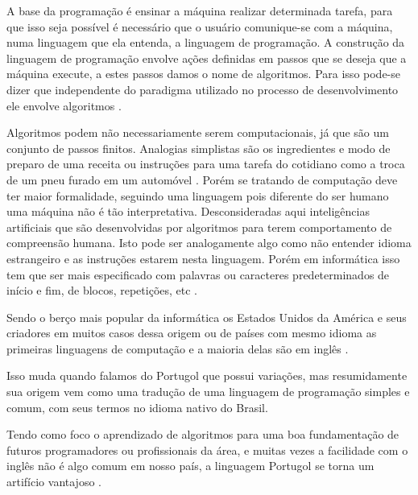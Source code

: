 \ifdraft{\color{green}}{}A base da programação é ensinar a máquina realizar determinada tarefa, para que isso seja possível é necessário que o usuário comunique-se com a máquina, numa linguagem que ela entenda, a linguagem de programação. A construção da linguagem de programação envolve ações definidas em passos que se deseja que a máquina execute, a estes passos damos o nome de algoritmos. Para isso pode-se dizer que independente do paradigma utilizado no processo de desenvolvimento ele envolve algoritmos \cite{medeiros2015}.

Algoritmos podem não necessariamente serem computacionais, já que são um conjunto de passos finitos. Analogias simplistas são os ingredientes e modo de preparo de uma receita ou instruções para uma tarefa do cotidiano como a troca de um pneu furado em um automóvel \cite{medina2006etal}. Porém se tratando de computação deve ter maior formalidade, seguindo uma linguagem pois diferente do ser humano uma máquina não é tão interpretativa. Desconsideradas aqui inteligências artificiais que são desenvolvidas por algoritmos para terem  comportamento de compreensão humana. Isto pode ser analogamente algo como não entender idioma estrangeiro e as instruções estarem nesta linguagem. Porém em informática isso tem que ser mais especificado com palavras ou caracteres predeterminados de início e fim, de blocos, repetições, etc \cite{dershem1990etal}.

Sendo o berço mais popular da informática os Estados Unidos da América e seus criadores em muitos casos dessa origem ou de países com mesmo idioma as primeiras linguagens de computação e a maioria delas são em inglês \cite{sebesta2009}.

Isso muda quando falamos do Portugol que possui variações, mas resumidamente sua origem vem como uma tradução de uma linguagem de programação simples e comum, com seus termos no idioma nativo do Brasil.

Tendo como foco o aprendizado de algoritmos para uma boa fundamentação de futuros programadores ou profissionais da área, e muitas vezes a facilidade com o inglês não é algo comum em nosso país, a linguagem Portugol se torna um artifício vantajoso \cite{jesus2004etal}.\color{black}
